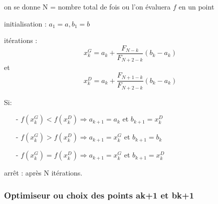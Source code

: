 \documentclass[a4paper,14pt]{article}
\begin{document}
\begin{list}{•}{ }

\item on se donne N = nombre total de fois ou l'on évaluera $f$ en un point
\item initialisation : $a_{1} = a, b_{1} = b$
\item itérations : \[x_{k}^{G} = a_{k} + \frac{F_{N-k}}{F_{N+2-k}}(b_{k} - a_{k})\]  et \[x_{k}^{D} = a_{k} + \frac{F_{N+1-k}}{F_{N+2-k}}(b_{k}-a_{k})\]
\item Si:
\begin{itemize}
\item[-] $f(x_{k}^{G}) < f(x_{k}^{D}) \Longrightarrow a_{k+1} = a_{k}$ et $b_{k+1} = x_{k}^{D}$
\item[-] $f(x_{k}^{G}) > f(x_{k}^{D}) \Longrightarrow a_{k+1} = x_{k}^{G}$ et $b_{k+1} = b_{k}$
\item[-] $f(x_{k}^{G}) = f(x_{k}^{D}) \Longrightarrow a_{k+1} = x_{k}^{G}$ et $b_{k+1} = x_{k}^{D}$
\end{itemize}

\item arrêt : après N itérations.
    
\end{list}

\subsubsection{Optimiseur ou choix des points ak+1 et bk+1}
\end{document}
